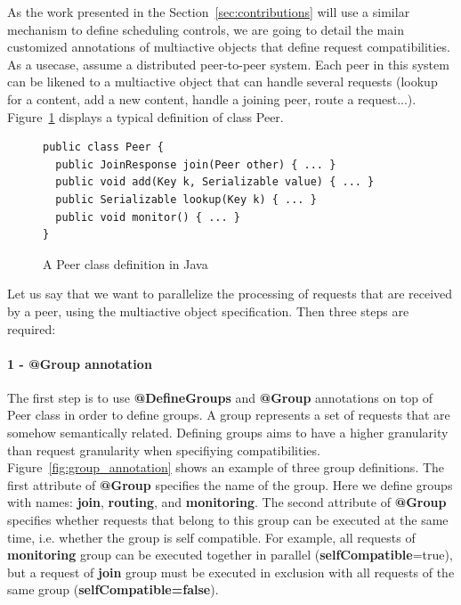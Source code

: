 \documentclass[11pt]{report}
\begin{document}
As the work presented in the Section~\ref{sec:contributions} will use a similar mechanism to define scheduling controls, we are going to detail the main customized annotations of multiactive objects that define request compatibilities. 
As a usecase, assume a distributed peer-to-peer system. Each peer in this system can be likened to a multiactive object that can handle several requests (lookup for a content, add a new content, handle a joining peer, route a request...). Figure~\ref{fig:regular_peer_class} displays a typical definition of class Peer.

\begin{figure}[!ht]
	\lstset{language=java, numbers=left, numberstyle=\tiny, stepnumber=1, numbersep=5pt, basicstyle=\footnotesize}
	\begin{lstlisting}[frame=single]
public class Peer {
  public JoinResponse join(Peer other) { ... }
  public void add(Key k, Serializable value) { ... }
  public Serializable lookup(Key k) { ... }
  public void monitor() { ... }
}
 	\end{lstlisting}
\caption{A Peer class definition in Java}
\label{fig:regular_peer_class}
\end{figure}

Let us say that we want to parallelize the processing of requests that are received by a peer, using the multiactive object specification. Then three steps are required: 

\paragraph{1 - \textbf{@Group} annotation}
The first step is to use \textbf{@DefineGroups} and \textbf{@Group} annotations on top of Peer class in order to define groups. A group represents a set of requests that are somehow semantically related. Defining groups aims to have a higher granularity than request granularity when specifiying compatibilities. Figure~\ref{fig:group_annotation} shows an example of three group definitions. The first attribute of \textbf{@Group} specifies the name of the group. Here we define groups with names: \textbf{join}, \textbf{routing}, and \textbf{monitoring}. The second attribute of \textbf{@Group} specifies whether requests that belong to this group can be executed at the same time, i.e. whether the group is self compatible. For example, all requests of \textbf{monitoring} group can be executed together in parallel (\textbf{selfCompatible}=true), but a request of \textbf{join} group must be executed in exclusion with all requests of the same group (\textbf{selfCompatible=false}).
\end{document}
